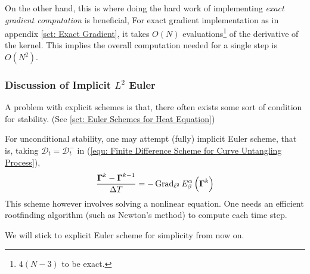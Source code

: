 \documentclass[../dissertation.tex]{subfiles}
\begin{document}
On the other hand, this is where doing the hard work of implementing \textit{exact gradient computation} is beneficial,
For exact gradient implementation as in appendix \ref{sct: Exact Gradient},
it takes $O \left( N \right)$ evaluations\footnote{$4 \left( N-3 \right)$ to be exact.} of the derivative of the kernel.
This implies the overall computation needed for a single step is $O \left( N^2 \right)$.

\subsubsection{Discussion of Implicit $L^2$ Euler}
A problem with explicit schemes is that, there often exists some sort of condition for stability. (See \ref{sct: Euler Schemes for Heat Equation})

For unconditional stability, one may attempt (fully) implicit Euler scheme, that is,
taking $\mathcal{D}_t = \mathcal{D}_t^-$ in (\ref{equ: Finite Difference Scheme for Curve Untangling Process}),
\begin{equation}
    \frac{\boldsymbol{\Gamma}^{k} - \boldsymbol{\Gamma}^{k-1}}{\Delta T} = -\operatorname{Grad}_{\ell^2} E_{\beta}^{\alpha} \left( \boldsymbol{\Gamma}^k \right)
\end{equation}
This scheme however involves solving a nonlinear equation.
One needs an efficient rootfinding algorithm (such as Newton's method) to compute each time step.

We will stick to explicit Euler scheme for simplicity from now on.

\end{document}
